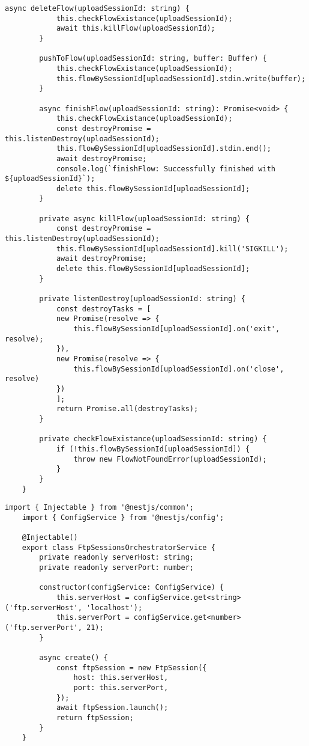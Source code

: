 \begin{lstlisting}[caption={fflow.service.ts}]
		async deleteFlow(uploadSessionId: string) {
			this.checkFlowExistance(uploadSessionId);
			await this.killFlow(uploadSessionId);
		}
		
		pushToFlow(uploadSessionId: string, buffer: Buffer) {
			this.checkFlowExistance(uploadSessionId);
			this.flowBySessionId[uploadSessionId].stdin.write(buffer);
		}
		
		async finishFlow(uploadSessionId: string): Promise<void> {
			this.checkFlowExistance(uploadSessionId);
			const destroyPromise = this.listenDestroy(uploadSessionId);
			this.flowBySessionId[uploadSessionId].stdin.end();
			await destroyPromise;
			console.log(`finishFlow: Successfully finished with ${uploadSessionId}`);
			delete this.flowBySessionId[uploadSessionId];
		}
		
		private async killFlow(uploadSessionId: string) {
			const destroyPromise = this.listenDestroy(uploadSessionId);
			this.flowBySessionId[uploadSessionId].kill('SIGKILL');
			await destroyPromise;
			delete this.flowBySessionId[uploadSessionId];
		}
		
		private listenDestroy(uploadSessionId: string) {
			const destroyTasks = [
			new Promise(resolve => {
				this.flowBySessionId[uploadSessionId].on('exit', resolve);
			}),
			new Promise(resolve => {
				this.flowBySessionId[uploadSessionId].on('close', resolve)
			})
			];
			return Promise.all(destroyTasks);
		}
		
		private checkFlowExistance(uploadSessionId: string) {
			if (!this.flowBySessionId[uploadSessionId]) {
				throw new FlowNotFoundError(uploadSessionId);
			}
		}
	}
\end{lstlisting}


\begin{lstlisting}[caption={ftp-sessions-orchestrator.service.ts}]
	import { Injectable } from '@nestjs/common';
	import { ConfigService } from '@nestjs/config';
	
	@Injectable()
	export class FtpSessionsOrchestratorService {
		private readonly serverHost: string;
		private readonly serverPort: number;
		
		constructor(configService: ConfigService) {
			this.serverHost = configService.get<string>('ftp.serverHost', 'localhost');
			this.serverPort = configService.get<number>('ftp.serverPort', 21);
		}
		
		async create() {
			const ftpSession = new FtpSession({
				host: this.serverHost,
				port: this.serverPort,
			});
			await ftpSession.launch();
			return ftpSession;
		}
	}
\end{lstlisting}

